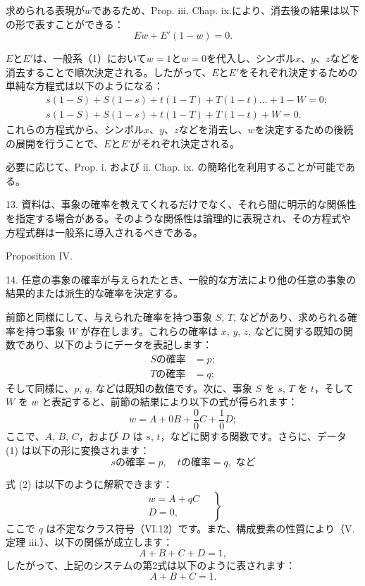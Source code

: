 \documentclass[a4paper,11pt,openany]{ltjsbook}
\begin{document}
求められる表現が$w$であるため、Prop. iii. Chap. ix.により、消去後の結果は以下の形で表すことができる：
\[
Ew + E'(1-w) = 0.
\]

$E$と$E'$は、一般系（1）において$w=1$と$w=0$を代入し、シンボル$x$、$y$、$z$などを消去することで順次決定される。したがって、$E$と$E'$をそれぞれ決定するための単純な方程式は以下のようになる：
\begin{align*}
&s(1-S)+S(1-s)+t(1-T) + T(1-t)\ldots+1-W=0;\\
&s(1-S)+S(1-s)+t(1-T) + T(1-t)+W=0.
\end{align*}
これらの方程式から、シンボル$x$、$y$、$z$などを消去し、$w$を決定するための後続の展開を行うことで、$E$と$E'$がそれぞれ決定される。

必要に応じて、Prop. i. および ii. Chap. ix. の簡略化を利用することが可能である。

13. 資料は、事象の確率を教えてくれるだけでなく、それら間に明示的な関係性を指定する場合がある。そのような関係性は論理的に表現され、その方程式や方程式群は一般系に導入されるべきである。

Proposition IV.

14. 任意の事象の確率が与えられたとき、一般的な方法により他の任意の事象の結果的または派生的な確率を決定する。

前節と同様にして、与えられた確率を持つ事象 \( S \), \( T \), などがあり、求められる確率を持つ事象 \( W \) が存在します。これらの確率は \( x \), \( y \), \( z \), などに関する既知の関数であり、以下のようにデータを表記します：
\[
\begin{aligned}
S の確率 &= p;\\
T の確率 &= q;
\end{aligned}\tag{1}
\]
そして同様に、\( p \), \( q \), などは既知の数値です。次に、事象 \( S \) を \( s \), \( T \) を \( t \)，そして \( W \) を \( w \) と表記すると、前節の結果により以下の式が得られます：
\[
w = A + 0B + \frac{0}{0} C + \frac{1}{0} D; \tag{2}
\]
ここで、\( A \), \( B \), \( C \)，および \( D \) は \( s \), \( t \)，などに関する関数です。さらに、データ (1) は以下の形に変換されます：
\[
s の確率 = p, \quad t の確率 = q, \text{ など} \tag{3}
\]

式 (2) は以下のように解釈できます：
\[
\left.
\begin{gathered}
w = A + qC\\
D=0,
\end{gathered}\quad\right\}\tag{4}
\]
ここで \( q \) は不定なクラス符号（VI.12）です。また、構成要素の性質により（V.定理 iii.）、以下の関係が成立します：
\[
A + B + C + D = 1,
\]
したがって、上記のシステムの第2式は以下のように表されます：
\[
A + B + C = 1.
\]
\end{document}
